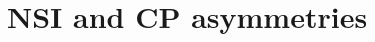 \documentclass[12pt]{article}
\begin{document}

\section{NSI and CP asymmetries}\label{CPasyNSI}
\end{document}
